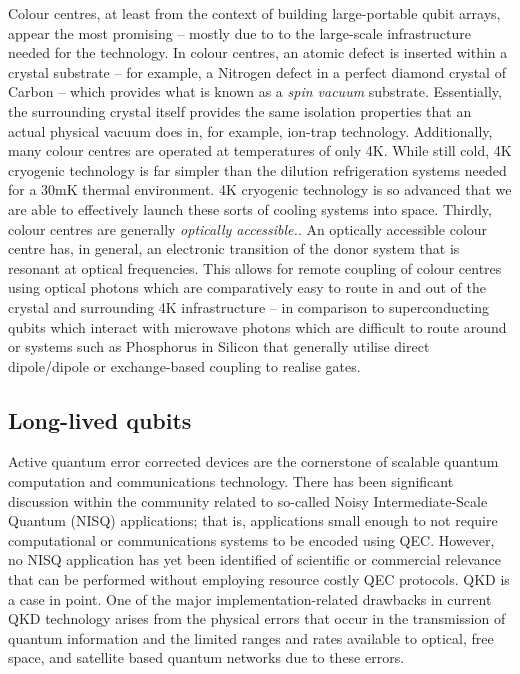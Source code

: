 \documentclass[twocolumn, aps, rmp, amsmath, amssymb, nofootinbib, superscriptaddress, longbibliography, floatfix, table-of-contents, eqsecnum]{revtex4-2}
\begin{document}
Colour centres, at least from the context of building large-portable qubit arrays, appear the most promising -- mostly due to to the large-scale infrastructure needed for the technology. In colour centres, an atomic defect is inserted within a crystal substrate -- for example, a Nitrogen defect in a perfect diamond crystal of Carbon -- which provides what is known as a \textit{spin vacuum} substrate. Essentially, the surrounding crystal itself provides the same isolation properties that an actual physical vacuum does in, for example, ion-trap technology. Additionally, many colour centres are operated at temperatures of only 4K. While still cold, 4K cryogenic technology is far simpler than the dilution refrigeration systems needed for a 30mK thermal environment. 4K cryogenic technology is so advanced that we are able to effectively launch these sorts of cooling systems into space. Thirdly, colour centres are generally \textit{optically accessible.}. An optically accessible colour centre has, in general, an electronic transition of the donor system that is resonant at optical frequencies. This allows for remote coupling of colour centres using optical photons which are comparatively easy to route in and out of the crystal and surrounding 4K infrastructure -- in comparison to superconducting qubits which interact with microwave photons which are difficult to route around or systems such as Phosphorus in Silicon that generally utilise direct dipole/dipole or exchange-based coupling to realise gates. 

\subsection{Long-lived qubits}

Active quantum error corrected devices are the cornerstone of scalable quantum computation and communications technology. There has been significant discussion within the community related to so-called Noisy Intermediate-Scale Quantum (NISQ) applications; that is, applications small enough to not require computational or communications systems to be encoded using QEC. However, no NISQ application has yet been identified of scientific or commercial relevance that can be performed without employing resource costly QEC protocols. QKD is a case in point. One of the major implementation-related drawbacks in current QKD technology arises from the physical errors that occur in the transmission of quantum information and the limited ranges and rates available to optical, free space, and satellite based quantum networks due to these errors. 
\end{document}
